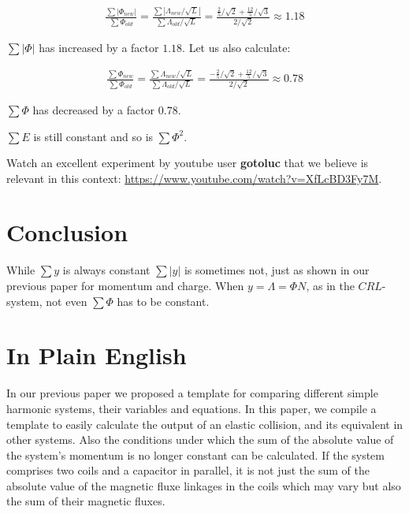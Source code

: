 \documentclass[]{../common/elementary-physics}
\begin{document}
\begin{subequations}
\begin{align}
\frac{\sum |\Phi_{new}|}{\sum \Phi_{old}} = \frac{\sum |\Lambda_{new} / \sqrt{L}|}{\sum \Lambda_{old} / \sqrt{L}} = \frac{\frac{2}{5}/\sqrt{2}+\frac{12}{5}/\sqrt{3}}{2/\sqrt{2}}\approx 1.18
\end{align}
\end{subequations}

$\sum |\Phi|$ has increased by a factor $1.18$.
Let us also calculate:

\begin{subequations}
\begin{align}
\frac{\sum \Phi_{new}}{\sum \Phi_{old}} = \frac{\sum \Lambda_{new} / \sqrt{L}}{\sum \Lambda_{old} / \sqrt{L}} = \frac{-\frac{2}{5}/\sqrt{2}+\frac{12}{5}/\sqrt{3}}{2/\sqrt{2}}\approx 0.78
\end{align}
\end{subequations}

$\sum \Phi$ has decreased by a factor $0.78$.

$\sum E$ is still constant and so is $\sum {\Phi}^2$.

Watch an excellent experiment by youtube user \textbf{gotoluc} that we believe is relevant in this context: \url{https://www.youtube.com/watch?v=XfLcBD3Fy7M}.

\section{Conclusion}

While $\sum y$ is always constant $\sum |y|$ is sometimes not, just as shown in our previous paper\cite{ef2ch} for momentum and charge.
When $y = \Lambda = \Phi N$, as in the $CRL$-system, not even $\sum \Phi$ has to be constant.

\appendix

\section{In Plain English}

In our previous paper\cite{ef2ch} we proposed a template for comparing different simple harmonic systems, their variables and equations.
In this paper, we compile a template to easily calculate the output of an elastic collision, and its equivalent in other systems.
Also the conditions under which the sum of the absolute value of the system's momentum is no longer constant can be calculated.
If the system comprises two coils and a capacitor in parallel, it is not just the sum of the absolute value of the magnetic fluxe linkages in the coils which may vary but also the sum of their magnetic fluxes.
\end{document}
